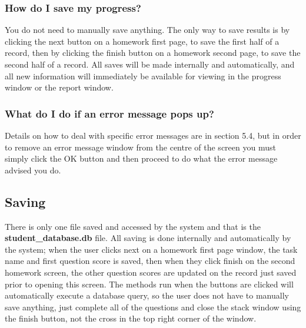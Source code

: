 
\subsubsection{How do I save my progress?}

You do not need to manually save anything. The only way to save results is by clicking the next button on a homework first page, to save the first half of a record, then by clicking the finish button on a homework second page, to save the second half of a record. All saves will be made internally and automatically, and all new information will immediately be available for viewing in the progress window or the report window.


\subsubsection{What do I do if an error message pops up?}

Details on how to deal with specific error messages are in section 5.4, but in order to remove an error message window from the centre of the screen you must simply click the OK button and then proceed to do what the error message advised you do.







\subsection{Saving}

There is only one file saved and accessed by the system and that is the \textbf{student\_database.db} file. All saving is done internally and automatically by the system; when the user clicks next on a homework first page window, the task name and first question score is saved, then when they click finish on the second homework screen, the other question scores are updated on the record just saved prior to opening this screen. The methods run when the buttons are clicked will automatically execute a database query, so the user does not have to manually save anything, just complete all of the questions and close the stack window using the finish button, not the cross in the top right corner of the window.

